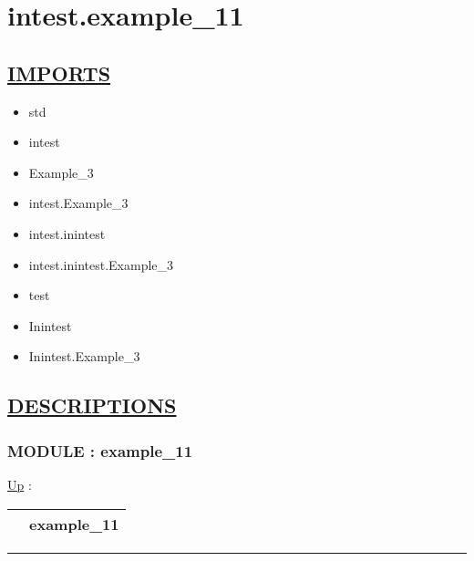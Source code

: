 \chapter*{intest.example\_11}
\hypertarget{ecldoc:toc:intest.example_11}{}

\section*{\underline{IMPORTS}}
\begin{itemize}
\item std
\item intest
\item Example\_3
\item intest.Example\_3
\item intest.inintest
\item intest.inintest.Example\_3
\item test
\item Inintest
\item Inintest.Example\_3
\end{itemize}

\section*{\underline{DESCRIPTIONS}}
\subsection*{MODULE : example\_11}
\hypertarget{ecldoc:intest.example_11}{}
\hyperlink{ecldoc:toc:intest}{Up} :

{\renewcommand{\arraystretch}{1.5}
\begin{tabularx}{\textwidth}{|>{\raggedright\arraybackslash}l|X|}
\hline
\hspace{0pt} & example\_11 \\
\hline
\end{tabularx}
}

\par


\rule{\linewidth}{0.5pt}
